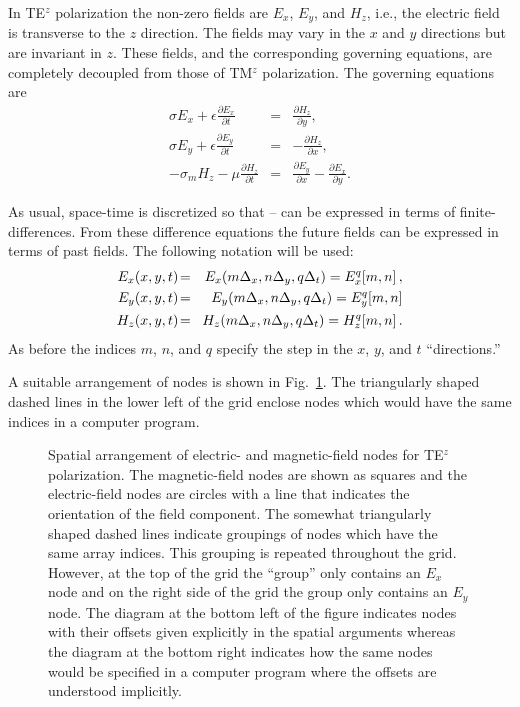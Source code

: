 In TE$^z$ polarization the non-zero fields are $E_x$, $E_y$, and
$H_z$, i.e., the electric field is transverse to the $z$ direction.
The fields may vary in the $x$ and $y$ directions but are invariant in
$z$.  These fields, and the corresponding governing equations, are
completely decoupled from those of TM$^z$ polarization.  The governing
equations are
\begin{eqnarray}
  \sigma E_x + \epsilon\frac{\partial E_x}{\partial t} &=&
    \frac{\partial H_z}{\partial y},  \label{eq:TEzX}
  \\
  \sigma E_y + \epsilon\frac{\partial E_y}{\partial t} &=&
    -\frac{\partial H_z}{\partial x}, \label{eq:TEzY}
  \\
  -\sigma_m H_z - \mu\frac{\partial H_z}{\partial t} &=&
     \frac{\partial E_y}{\partial x}
    -\frac{\partial E_x}{\partial y}. \label{eq:TEzZ}
\end{eqnarray}

As usual, space-time is discretized so that
-- can be expressed in
terms of finite-differences.  From these difference equations the
future fields can be expressed in terms of past fields.  The following
notation will be used:
\begin{eqnarray}
  E_x(x,y,t) \!&=&\! E_x(m\Delx, n\Dely, q\Delt) =
          \fdtd{E_x}{m,n}{q},  \\
  E_y(x,y,t) \!&=&\! E_y(m\Delx, n\Dely, q\Delt) =
          \fdtd{E_y}{m,n}{q}  \\
  H_z(x,y,t) \!&=&\! H_z(m\Delx, n\Dely, q\Delt) = \fdtd{H_z}{m,n}{q}.
\end{eqnarray}
As before the indices $m$, $n$, and $q$ specify the step in the $x$,
$y$, and $t$ ``directions.''

A suitable arrangement of nodes is shown in Fig.\ \ref{fig:tezGrid}.
The triangularly shaped dashed lines in the lower left of the grid
enclose nodes which would have the same indices in a computer
program.

\begin{figure}
  \begin{center}
  \end{center} \caption{Spatial arrangement of electric- and
  magnetic-field nodes for TE$^z$ polarization.  The magnetic-field
  nodes are shown as squares and the electric-field nodes are circles
  with a line that indicates the orientation of the field component.
  The somewhat triangularly shaped dashed lines indicate groupings of
  nodes which have the same array indices. This grouping is repeated
  throughout the grid.  However, at the top of the grid the ``group''
  only contains an $E_x$ node and on the right side of the grid the
  group only contains an $E_y$ node.  The diagram at the bottom left
  of the figure indicates nodes with their offsets given explicitly in
  the spatial arguments whereas the diagram at the bottom right
  indicates how the same nodes would be specified in a computer
  program where the offsets are understood implicitly.}
  \label{fig:tezGrid}
\end{figure}

